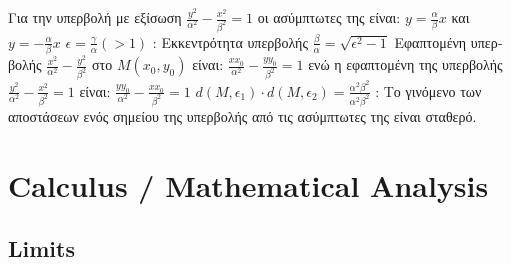 \documentclass[12pt]{article}
\begin{document}
\begin{flushleft}
	\textgreek{Για την υπερβολή με εξίσωση} $\frac{y^2}{\alpha^2} - \frac{x^2}{\beta^2} = 1$ \textgreek{οι ασύμπτωτες της είναι: } $y=\frac{\alpha}{\beta}x$ \textgreek{και} $y=-\frac{\alpha}{\beta}x$ \linebreak 
	\textbullet \quad $\displaystyle \epsilon = \frac{\gamma}{\alpha} (>1)$ \textgreek{: Εκκεντρότητα υπερβολής} \linebreak 
	\textbullet \quad $\displaystyle \frac{\beta}{\alpha} = \sqrt{\epsilon^2 -1}$ \linebreak 
	\textbullet \quad \textgreek{Εφαπτομένη υπερβολής} $\displaystyle \frac{x^2}{\alpha^2} - \frac{y^2}{\beta^2}$ \textgreek{στο} $M(x_0, y_0)$ \textgreek{είναι}: $\displaystyle  \frac{xx_0}{\alpha^2} -\frac{yy_0}{\beta^2} = 1$ \textgreek{ενώ η εφαπτομένη της υπερβολής} $\displaystyle \frac{y^2}{\alpha^2} - \frac{x^2}{\beta^2} = 1 $ \textgreek{είναι}: $\displaystyle \frac{yy_0}{\alpha^2} -\frac{xx_0}{\beta^2} = 1$ \linebreak 
	\textbullet \quad $\displaystyle d(M,\epsilon_1) \cdot d(M,\epsilon_2) = \frac{\alpha^2 \beta^2}{\alpha^2 \beta^2}$  :  \textgreek{Το γινόμενο των αποστάσεων ενός σημείου της υπερβολής από τις ασύμπτωτες της είναι σταθερό.} \linebreak

	
	\pagebreak
		
	
	\section{Calculus / Mathematical Analysis}

	\subsection{Limits}
	

\end{flushleft}
\end{document}
